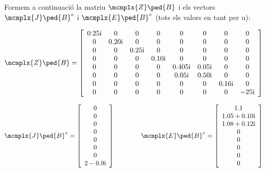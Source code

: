 \begin{exemple}
    Formem a continuació la matriu $\mcmplx{Z}\ped{B}$ i els vectors $\mcmplx{J}\ped{B}^\circ$ i $\mcmplx{E}\ped{B}^\circ$ (tots els valors en tant per u):

    \[
       \mcmplx{Z}\ped{B} =
       \begin{bmatrix}\begin{array}{cccccccc}
         \complexnum{j 0,25} & 0 & 0 & 0 & 0 & 0 & 0 & 0 \\
         0 & \complexnum{j 0,20} & 0 & 0 & 0 & 0 & 0 & 0 \\
         0 & 0 & \complexnum{j 0,25} & 0 & 0 & 0 & 0 & 0 \\
         0 & 0 & 0 & \complexnum{j 0,10} & 0 & 0 & 0 & 0 \\
         0 & 0 & 0 & 0 & \complexnum{j 0,405} & \complexnum{j 0,05} & 0 & 0 \\
         0 & 0 & 0 & 0 & \complexnum{j 0,05} & \complexnum{j 0,50} & 0 & 0 \\
         0 & 0 & 0 & 0 & 0 & 0 & \complexnum{j 0,16} & 0 \\
         0 & 0 & 0 & 0 & 0 & 0 & 0 & \complexnum{-j 25}
       \end{array}\end{bmatrix}
    \]

    \[
       \mcmplx{J}\ped{B}^\circ =
       \begin{bmatrix}\begin{array}{c}
        0 \\
        0 \\
        0 \\
        0 \\
        0 \\
        0 \\
        0 \\
        \complexnum{2 - j 0,9}
       \end{array}\end{bmatrix}
       \qquad \qquad
       \mcmplx{E}\ped{B}^\circ =
       \begin{bmatrix}\begin{array}{c}
        \num{1,1} \\
        \complexnum{1,05 + j 0,10} \\
        \complexnum{1,08 + j 0,12} \\
        0 \\
        0 \\
        0 \\
        0 \\
        0
      \end{array}\end{bmatrix}
    \]


\end{exemple}
